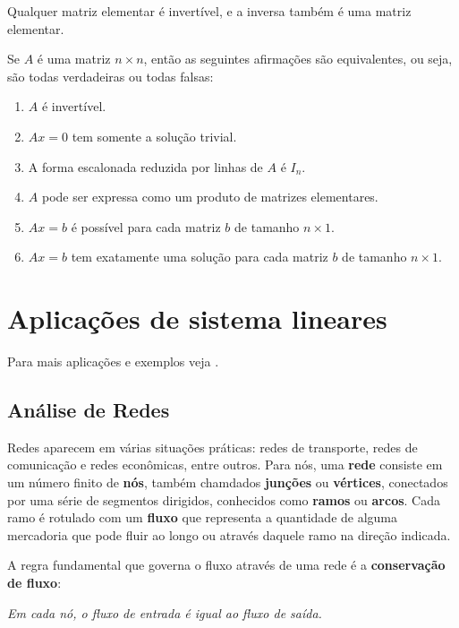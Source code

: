 \begin{teorema}
    Qualquer matriz elementar é invertível, e a inversa também é uma matriz elementar.
\end{teorema}

\begin{teorema}
    Se $A$ é uma matriz $n \times n$, então as seguintes afirmações são equivalentes, ou seja, são todas verdadeiras ou todas falsas:
    \begin{enumerate}[label={\roman*})]
        \item $A$ é invertível.
        \item $Ax = 0$ tem somente a solução trivial.
        \item A forma escalonada reduzida por linhas de $A$ é $I_n$.
        \item $A$ pode ser expressa como um produto de matrizes elementares.
        \item $Ax = b$ é possível para cada matriz $b$ de tamanho $n \times 1$.
        \item $Ax = b$ tem exatamente uma solução para cada matriz $b$ de tamanho $n \times 1$.
    \end{enumerate}
\end{teorema}

\section{Aplicações de sistema lineares}

Para mais aplicações e exemplos veja \cite{Poole:2016,Anton:2012}.
\subsection{Análise de Redes}

Redes aparecem em várias situações práticas: redes de transporte, redes de comunicação e redes econômicas, entre outros. Para nós, uma \textbf{rede} consiste em um número finito de \textbf{nós}, também chamdados \textbf{junções} ou \textbf{vértices}, conectados por uma série de segmentos dirigidos, conhecidos como \textbf{ramos} ou \textbf{arcos}. Cada ramo é rotulado com um \textbf{fluxo} que representa a quantidade de alguma mercadoria  que pode fluir ao longo ou através daquele ramo na direção indicada.

A regra fundamental que governa o fluxo através de uma rede é a \textbf{conservação de fluxo}:

\begin{tcolorbox}[colback=green!30, colframe=green!80!blue, title=Conservação de fluxo]
    \textit{Em cada nó, o fluxo de entrada é igual ao fluxo de saída.}
\end{tcolorbox}

